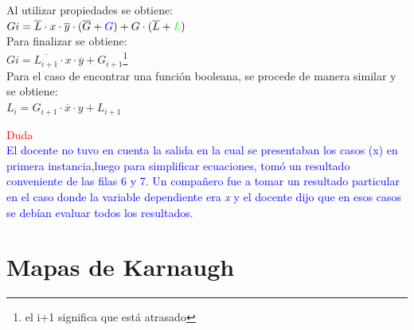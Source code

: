 \documentclass[12pt,letterpaper]{book}
\begin{document}
\begin{multicols}{2}
Al utilizar propiedades se obtiene:\\


$Gi=\overline{L}\cdot x \cdot \overline{y}\cdot (\overline{G} + \textcolor{blue}{G}) + G \cdot( \overline{L}+\textcolor{green}{L})$\\


Para finalizar se obtiene:\\


$Gi=\overline{L_{i+1}}\cdot x \cdot \overline{y} + G_{i+1}$\footnote{el i+1 significa que está atrasado}\\



Para el caso de encontrar una función booleana, se procede de manera similar y se obtiene:\\

$L_i=G_{i+1} \cdot \overline{x} \cdot y+L_{i+1}$


\textcolor{red}{Duda} \\

\textcolor{blue}{
El docente no tuvo en cuenta la salida en la cual se presentaban los casos (x) en primera instancia,luego para simplificar ecuaciones, tomó un resultado conveniente de las filas 6 y 7. Un compañero fue a tomar un resultado particular en el caso donde la variable dependiente era \textit{x} y el docente dijo que en esos casos se debían evaluar todos los resultados.  
}

\end{multicols}

\section{Mapas de Karnaugh}
\end{document}

